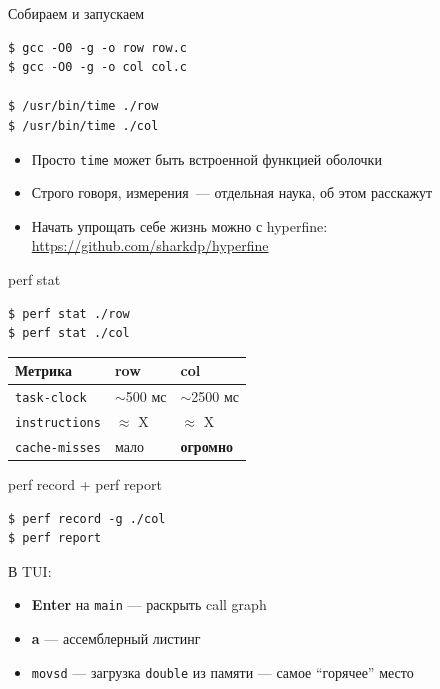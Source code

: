 \documentclass[aspectratio=169, russian]{beamer}
\begin{document}
\begin{frame}[fragile]{Собираем и запускаем}
    \begin{verbatim}
$ gcc -O0 -g -o row row.c
$ gcc -O0 -g -o col col.c

$ /usr/bin/time ./row
$ /usr/bin/time ./col
\end{verbatim}

    \begin{itemize}
        \item Просто \texttt{time} может быть встроенной функцией оболочки
        \item Строго говоря, измерения~--- отдельная наука, об этом расскажут
        \item Начать упрощать себе жизнь можно с hyperfine: \url{https://github.com/sharkdp/hyperfine}
    \end{itemize}

\end{frame}

\begin{frame}[fragile]{perf stat}
    \begin{verbatim}
$ perf stat ./row
$ perf stat ./col
\end{verbatim}

    \bigskip
    \begin{center}
        \begin{tabular}{lll}
            \toprule
            Метрика               & row          & col                      \\
            \midrule
            \texttt{task-clock}   & $\sim$500 мс & $\sim$2500 мс            \\
            \texttt{instructions} & $\approx$ X  & $\approx$ X              \\
            \texttt{cache-misses} & мало         & \alert{\textbf{огромно}} \\
            \bottomrule
        \end{tabular}
    \end{center}

\end{frame}

\begin{frame}[fragile]{perf record + perf report}
    \begin{verbatim}
$ perf record -g ./col
$ perf report
\end{verbatim}

    \bigskip
    В TUI:
    \begin{itemize}
        \item \textbf{Enter} на \texttt{main} --- раскрыть call graph
        \item \textbf{a} --- ассемблерный листинг
        \item \texttt{movsd} --- загрузка \texttt{double} из памяти --- самое \enquote{горячее} место
    \end{itemize}

\end{frame}
\end{document}
